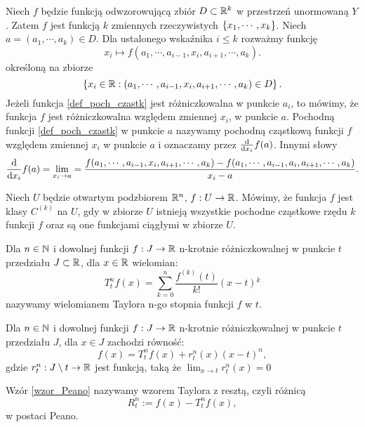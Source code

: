 \documentclass[12pt,a4paper]{report}
\begin{document}
\begin{definition}
Niech $f$ będzie funkcją odwzorowującą zbiór $D \subset \mathbb{R}^k $ w przestrzeń unormowaną $Y$. Zatem $f$ jest funkcją $k$ zmiennych rzeczywistych $\left\lbrace {x_1,\cdots,x_k} \right\rbrace$. Niech $a=(a_1,\cdots,a_k) \in D $. Dla ustalonego wskaźnika $i \leq k$ rozważmy funkcję 
\begin{equation}\label{def_poch_czastk}
x_i \mapsto f(a_1,\cdots,a_{i-1},x_i,a_{i+1},\cdots,a_k).
\end{equation}
określoną na zbiorze 
$$
\left\lbrace {x_i \in \mathbb{R}: (a_1,\cdots,a_{i-1},x_i,a_{i+1},\cdots,a_k) \in D} \right\rbrace.
$$
Jeżeli funkcja \eqref{def_poch_czastk} jest różniczkowalna w punkcie $a_i$, to mówimy, że funkcja $f$ jest różniczkowalna względem zmiennej $x_i$, w punkcie $a$. Pochodną funkcji \eqref{def_poch_czastk} w punkcie $a$ nazywamy pochodną cząstkową funkcji $f$ względem zmiennej $x_i$ w punkcie $a$ i oznaczamy przez $\frac{\mathrm{d} {} }{\mathrm{d}{x_i}} f(a) $. Innymi słowy 
\begin{equation}
\ddx{x_i} f(a) = \lim_{x_i \to a} = \frac{f(a_1,\cdots,a_{i-1},x_i,a_{i+1},\cdots,a_k) - f(a_1,\cdots,a_{i-1},a_i,a_{i+1},\cdots,a_k)}{x_i - a} .
\end{equation}
\end{definition}


\begin{definition}[klasa $C^{(k)}$]
Niech $U$ będzie otwartym podzbiorem $ \mathbb{R}^n $, $ f: U \to \mathbb{R} $. Mówimy, że funkcja $f$ jest klasy $C^{(k)}$ na $U$,  gdy w zbiorze $U$ istnieją wszystkie pochodne cząstkowe rzędu $k$ funkcji $f$ oraz są one funkcjami ciągłymi w zbiorze $U$. 
\end{definition}

\begin{definition}
Dla $ n \in \mathbb{N} $ i dowolnej funkcji $ f: J \to \mathbb{R} $ n-krotnie różniczkowalnej w punkcie $t$ przedziału $ J \subset \mathbb{R} $, dla $x \in \mathbb{R} $  wielomian: 
\begin{equation}
T_{t}^{n}f(x) = \sum_{k=0}^{n} \frac{f^{(k)}(t)}{k!} (x-t){^k}  
\end{equation}
nazywamy wielomianem Taylora n-go stopnia funkcji $f$ w $t$.
\end{definition}

\begin{theorem} \label{wzor_Peano}
Dla $n \in \mathbb{N}$ i dowolnej funkcji $ f: J \to \mathbb{R} $ n-krotnie różniczkowalnej w punkcie $t$ przedziału $J$, dla $x \in J$ zachodzi równość:
\begin{equation}
f(x) = T_{t}^{n}f(x) + r_{t}^{n}(x)(x-t)^n ,
\end{equation}
gdzie $r_{t}^{n} : J \setminus t \to \mathbb{R} $ jest funkcją, taką że $ \lim_{x \to t} r_{t}^{n}(x) = 0 $
\end{theorem}
\begin{definition}
Wzór \ref{wzor_Peano} nazywamy wzorem Taylora z resztą, czyli różnicą 
$$
R_{t}^{n} := f(x) - T_{t}^{n}f(x), 
$$
w postaci Peano. 
\end{definition}
\end{document}
